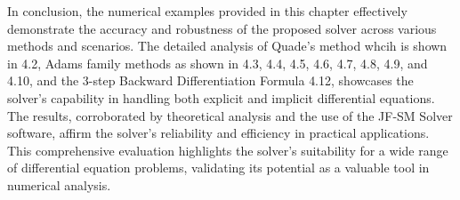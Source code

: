 \newpage
In conclusion, the numerical examples provided in this chapter effectively demonstrate the accuracy and robustness of the proposed solver across various methods and scenarios. The detailed analysis of Quade's method whcih is shown in \figurename{ 4.2}, Adams family methods as shown in \figurename{ 4.3},\figurename{ 4.4},\figurename{ 4.5},\figurename{ 4.6},\figurename{ 4.7},\figurename{ 4.8},\figurename{ 4.9}, and \figurename{ 4.10}, and the 3-step Backward Differentiation Formula \figurename{ 4.12}, showcases the solver's capability in handling both explicit and implicit differential equations. The results, corroborated by theoretical analysis and the use of the JF-SM Solver software, affirm the solver's reliability and efficiency in practical applications. This comprehensive evaluation highlights the solver's suitability for a wide range of differential equation problems, validating its potential as a valuable tool in numerical analysis.

